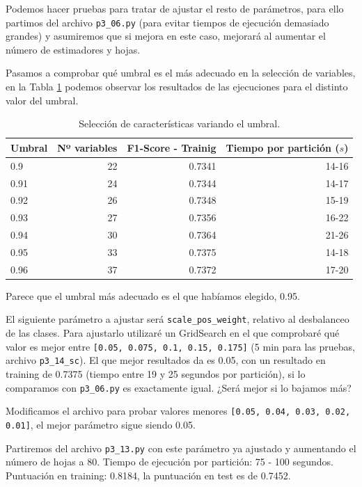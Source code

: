 \documentclass[a4paper, 20pt]{article}
\begin{document}
Podemos hacer pruebas para tratar de ajustar el resto de parámetros, para ello partimos del archivo \texttt{p3\_06.py} (para evitar tiempos de ejecución demasiado grandes) y asumiremos que si mejora en este caso, mejorará al aumentar el número de estimadores y hojas.

Pasamos a comprobar qué umbral es el más adecuado en la selección de variables, en la Tabla \ref{tab:14} podemos observar los resultados de las ejecuciones para el distinto valor del umbral.

\begin{table}[H]
\centering
\caption{Selección de características variando el umbral.}
\label{tab:14}
\begin{tabular}{lrrr}
\toprule
Umbral & Nº variables & F1-Score - Trainig & Tiempo por partición ($s$)\\
\midrule
0.9 & 22 & 0.7341 & 14-16\\
0.91 & 24 & 0.7344 & 14-17 \\
0.92 & 26 & 0.7348 & 15-19 \\
0.93 & 27 & 0.7356 & 16-22 \\  
0.94 & 30 & 0.7364 & 21-26 \\
0.95 & 33 & 0.7375 & 14-18\\
0.96 & 37 & 0.7372 & 17-20\\ 
\bottomrule
\end{tabular}
\end{table}

Parece que el umbral más adecuado es el que habíamos elegido, 0.95.

El siguiente parámetro a ajustar será \texttt{scale\_pos\_weight}, relativo al desbalanceo de las clases. Para ajustarlo utilizaré un GridSearch en el que comprobaré qué valor es mejor entre \texttt{[0.05, 0.075, 0.1, 0.15, 0.175]} (5 min para las pruebas, archivo \texttt{p3\_14\_sc}). El que mejor resultados da es 0.05, con un resultado en training de 0.7375 (tiempo entre 19 y 25 segundos por partición), si lo comparamos con \texttt{p3\_06.py} es exactamente igual. ¿Será mejor si lo bajamos más?

Modificamos el archivo para probar valores menores \texttt{[0.05, 0.04, 0.03, 0.02, 0.01]}, el mejor parámetro sigue siendo 0.05.

Partiremos del archivo \texttt{p3\_13.py} con este parámetro ya ajustado y aumentando el número de hojas a 80. Tiempo de ejecución por partición: 75 - 100 segundos. Puntuación en training: 0.8184, la puntuación en test es de 0.7452.
\end{document}

